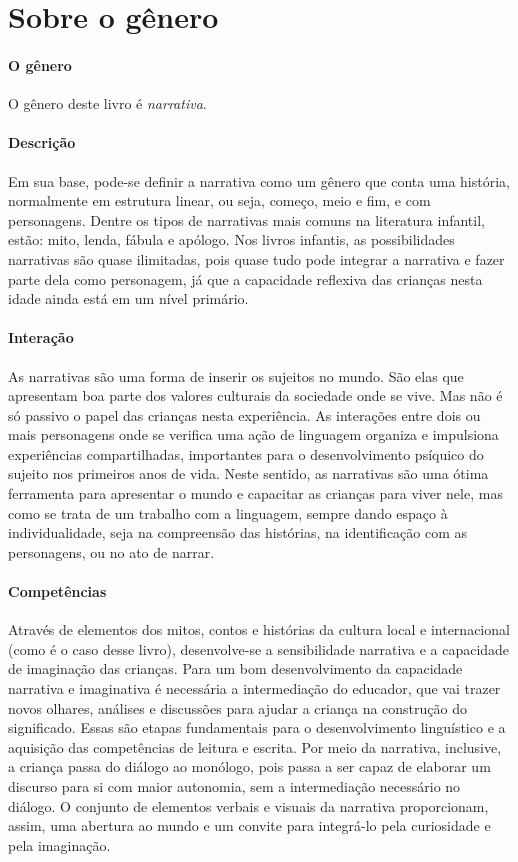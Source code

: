 \documentclass[11pt]{extarticle}
\begin{document}
\section{Sobre o gênero}

\paragraph{O gênero} O gênero deste livro é \textit{narrativa}. 

\paragraph{Descrição} Em sua base, pode-se definir a narrativa como um gênero que conta uma história, normalmente em estrutura linear, ou seja, começo, meio e fim, e com personagens. 
Dentre os tipos de narrativas mais comuns na literatura infantil, estão: mito, lenda, 
fábula e apólogo. Nos livros infantis, as possibilidades narrativas são quase ilimitadas, pois quase tudo pode integrar a narrativa e fazer parte dela como personagem, já que a capacidade reflexiva das crianças nesta idade ainda está em um nível primário. 



\paragraph{Interação} As narrativas são uma forma de inserir os sujeitos no mundo. 
São elas que apresentam boa parte dos valores culturais da sociedade 
onde se vive. Mas não é só passivo o papel das crianças nesta experiência. 
As interações entre dois ou mais personagens onde se verifica
uma ação de linguagem organiza e impulsiona experiências compartilhadas,
importantes para o desenvolvimento psíquico do sujeito nos primeiros anos de vida.
Neste sentido, as narrativas são uma ótima ferramenta para
apresentar o mundo e capacitar as crianças para viver nele, mas como se
trata de um trabalho com a linguagem, sempre dando espaço à individualidade, 
seja na compreensão das histórias, na identificação com as personagens, ou 
no ato de narrar.

\paragraph{Competências} 
Através de elementos dos mitos, contos e histórias da cultura local e internacional (como é o caso desse livro), desenvolve-se a sensibilidade narrativa e a capacidade de imaginação das crianças. Para um bom desenvolvimento da capacidade narrativa e imaginativa é necessária a intermediação do educador, que vai trazer novos olhares, análises e discussões para ajudar a criança na construção do significado. Essas são etapas fundamentais para o desenvolvimento linguístico e a aquisição das competências de leitura e escrita. Por meio da narrativa, inclusive, a criança passa do diálogo ao monólogo, pois passa a ser capaz de elaborar um discurso para si com maior autonomia, sem a intermediação necessário no diálogo.
O conjunto de elementos verbais e visuais da narrativa proporcionam, assim,
uma abertura ao mundo e um convite para integrá-lo pela curiosidade e pela imaginação.
\end{document}
